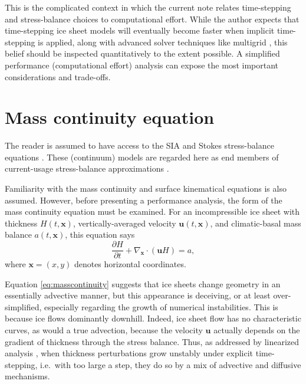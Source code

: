 \documentclass[twocolumn,letterpaper]{igs}
\newcommand\bu{\mathbf{u}}
\newcommand\bx{\mathbf{x}}
\newcommand{\Divx}{\nabla_\bx \cdot}
\begin{document}
This is the complicated context in which the current note relates time-stepping and stress-balance choices to computational effort.  While the author expects that time-stepping ice sheet models will eventually become faster when implicit time-stepping is applied, along with advanced solver techniques like multigrid \citep{Briggsetal2000}, this belief should be inspected quantitatively to the extent possible.  A simplified performance (computational effort) analysis can expose the most important considerations and trade-offs.


\section{Mass continuity equation}

The reader is assumed to have access to the SIA and Stokes stress-balance equations \citep{GreveBlatter2009,SchoofHewitt2013}.  These (continuum) models are regarded here as end members of current-usage stress-balance approximations \citep{Robinsonetal2022}.

Familiarity with the mass continuity and surface kinematical equations \citep{GreveBlatter2009} is also assumed.  However, before presenting a performance analysis, the form of the mass continuity equation must be examined.  For an incompressible ice sheet with thickness $H(t,\bx)$, vertically-averaged velocity $\bu(t,\bx)$, and climatic-basal mass balance $a(t,\bx)$, this equation says
\begin{equation}
\frac{\partial H}{\partial t} + \Divx \left(\bu H\right) = a, \label{eq:masscontinuity}
\end{equation}
where $\bx=(x,y)$ denotes horizontal coordinates.

Equation \eqref{eq:masscontinuity} suggests that ice sheets change geometry in an essentially advective manner, but this appearance is deceiving, or at least over-simplified, especially regarding the growth of numerical instabilities.  This is because ice flows dominantly downhill.  Indeed, ice sheet flow has no characteristic curves, as would a true advection, because the velocity $\bu$ actually depends on the gradient of thickness through the stress balance.  Thus, as addressed by linearized analysis \citep{Chengetal2017,Robinsonetal2022}, when thickness perturbations grow unstably under explicit time-stepping, i.e.~with too large a step, they do so by a mix of advective and diffusive mechanisms.
\end{document}
